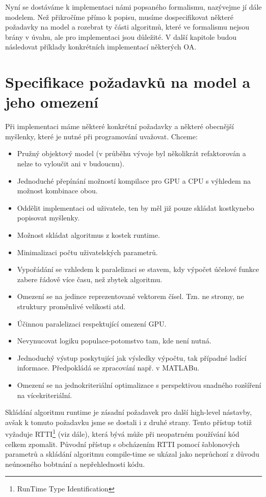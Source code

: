 
Nyní se dostáváme k implementaci námi popsaného formalismu, nazývejme jí dále modelem. Než přikročíme přímo k popisu, musíme dospecifikovat některé požadavky na model a rozebrat ty části algoritmů, které ve formalismu nejsou brány v úvahu, ale pro implementaci jsou důležité. V další kapitole budou následovat příklady konkrétních implementací některých OA.

\section{Specifikace požadavků na model a jeho omezení}

Při implementaci máme některé konkrétní požadavky a některé obecnější myšlenky, které je nutné při programování uvažovat. Chceme:
\begin{itemize}
  \item Pružný objektový model (v průběhu vývoje byl několikrát refaktorován a nelze to vyloučit ani v budoucnu).
  \item Jednoduché přepínání možností kompilace pro GPU a CPU s výhledem na možnost kombinace obou.
  \item Oddělit implementaci od uživatele, ten by měl již pouze \bq skládat kostky\eq  nebo popisovat myšlenky.
  \item Možnost skládat algoritmus z kostek runtime.
  \item Minimalizaci počtu uživatelských parametrů.
  \item Vypořádání se vzhledem k paralelizaci se stavem, kdy výpočet účelové funkce zabere řádově více času, než zbytek algoritmu.
  \item Omezení se na jedince reprezentované vektorem čísel. Tzn. ne stromy, ne struktury proměnlivé velikosti atd.
  \item Účinnou paralelizaci respektující omezení GPU.
  \item Nevynucovat logiku populace-potomstvo tam, kde není nutná.
  \item Jednoduchý výstup poskytující jak výsledky výpočtu, tak případné ladící informace. Předpokládá se zpracování např. v MATLABu.
  \item Omezení se na jednokriteriální optimalizace s perspektivou snadného rozšíření na vícekriteriální.
\end{itemize}

Skládání algoritmu runtime je zásadní požadavek pro další high-level nástavby, avšak k tomuto požadavku jsme se dostali i z druhé strany. Tento přístup totiž vyžaduje RTTI\footnote{RunTime Type Identification} (viz dále), která bývá může při neopatrném používání kód celkem zpomalit. Původní přístup s obcházením RTTI pomocí šablonových parametrů a skládání algoritmu compile-time se ukázal jako neprůchozí z důvodu neúnosného bobtnání a nepřehlednosti kódu.


